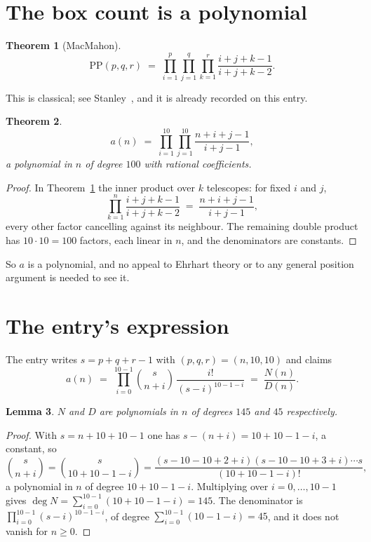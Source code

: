 \documentclass[11pt,a4paper]{article}
\theoremstyle{plain}
\newtheorem{theorem}{Theorem}
\newtheorem{lemma}[theorem]{Lemma}
\theoremstyle{definition}
\begin{document}
\section{The box count is a polynomial}

\begin{theorem}[MacMahon]\label{thm:mm}
\[
\mathrm{PP}(p,q,r)\;=\;\prod_{i=1}^{p}\prod_{j=1}^{q}\prod_{k=1}^{r}
\frac{i+j+k-1}{i+j+k-2} .
\]
\end{theorem}

This is classical; see Stanley~\cite{stanley}, and it is already recorded on this entry.

\begin{theorem}\label{thm:poly}
\[
a(n)\;=\;\prod_{i=1}^{10}\prod_{j=1}^{10}\frac{n+i+j-1}{i+j-1},
\]
a polynomial in $n$ of degree $100$ with rational coefficients.
\end{theorem}

\begin{proof}
In Theorem~\ref{thm:mm} the inner product over $k$ telescopes: for fixed $i$ and $j$,
\[
\prod_{k=1}^{n}\frac{i+j+k-1}{i+j+k-2}\;=\;\frac{n+i+j-1}{i+j-1} ,
\]
every other factor cancelling against its neighbour. The remaining double product has
$10\cdot10=100$ factors, each linear in $n$, and the denominators are constants.
\end{proof}

So $a$ is a polynomial, and no appeal to Ehrhart theory or to any general position argument is
needed to see it.

\section{The entry's expression}

The entry writes $s=p+q+r-1$ with $(p,q,r)=(n,10,10)$ and claims
\[
a(n)\;=\;\prod_{i=0}^{10-1}\binom{s}{n+i}\,\frac{i!}{(s-i)^{10-1-i}}\;=\;
\frac{N(n)}{D(n)} .
\]

\begin{lemma}\label{lem:deg}
$N$ and $D$ are polynomials in $n$ of degrees $145$ and $45$ respectively.
\end{lemma}

\begin{proof}
With $s=n+10+10-1$ one has $s-(n+i)=10+10-1-i$, a constant, so
\[
\binom{s}{n+i}=\binom{s}{10+10-1-i}
=\frac{(s-10-10+2+i)(s-10-10+3+i)\cdots s}{(10+10-1-i)!},
\]
a polynomial in $n$ of degree $10+10-1-i$. Multiplying over $i=0,\dots,10-1$ gives
$\deg N=\sum_{i=0}^{10-1}(10+10-1-i)=145$. The denominator is
$\prod_{i=0}^{10-1}(s-i)^{10-1-i}$, of degree
$\sum_{i=0}^{10-1}(10-1-i)=45$, and it does not vanish for $n\ge0$.
\end{proof}
\end{document}
